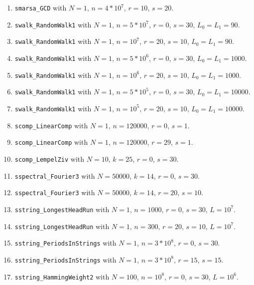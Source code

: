 \begin{enumerate}
  \item {\tt smarsa\_GCD} with $N=1$, $n=4*10^7$, $r=10$, $s=20$.

  \item {\tt swalk\_RandomWalk1} with $N=1$, $n=5*10^7$, $r=0$,
   $s=30$, $L_0=L_1=90$.

  \item {\tt swalk\_RandomWalk1} with $N=1$, $n=10^7$, $r=20$,
   $s=10$, $L_0=L_1=90$.

  \item {\tt swalk\_RandomWalk1} with $N=1$, $n=5*10^6$, $r=0$,
   $s=30$, $L_0=L_1=1000$.

  \item {\tt swalk\_RandomWalk1} with $N=1$, $n=10^6$, $r=20$,
   $s=10$, $L_0=L_1=1000$.

  \item {\tt swalk\_RandomWalk1} with $N=1$, $n=5*10^5$, $r=0$,
   $s=30$, $L_0=L_1=10000$.

  \item {\tt swalk\_RandomWalk1} with $N=1$, $n=10^5$, $r=20$,
   $s=10$, $L_0=L_1=10000$.

  \item {\tt scomp\_LinearComp} with $N=1$, $n=120000$, $r=0$, $s=1$.

  \item {\tt scomp\_LinearComp} with $N=1$, $n=120000$, $r=29$, $s=1$.

  \item {\tt scomp\_LempelZiv} with $N=10$, $k=25$, $r=0$, $s=30$.

  \item {\tt sspectral\_Fourier3} with $N=50000$, $k=14$, $r=0$, $s=30$.

  \item {\tt sspectral\_Fourier3} with $N=50000$, $k=14$, $r=20$, $s=10$.

  \item {\tt sstring\_LongestHeadRun} with $N=1$, $n=1000$, $r=0$,
   $s=30$, $L=10^7$.

  \item {\tt sstring\_LongestHeadRun} with $N=1$, $n=300$, $r=20$,
   $s=10$, $L=10^7$.

  \item {\tt sstring\_PeriodsInStrings} with $N=1$, $n=3*10^8$, $r=0$,
   $s=30$.

  \item {\tt sstring\_PeriodsInStrings} with $N=1$, $n=3*10^8$, $r=15$,
   $s=15$.

  \item {\tt sstring\_HammingWeight2} with $N=100$, $n=10^8$, $r=0$,
   $s=30$, $L=10^6$.


\end{enumerate}
